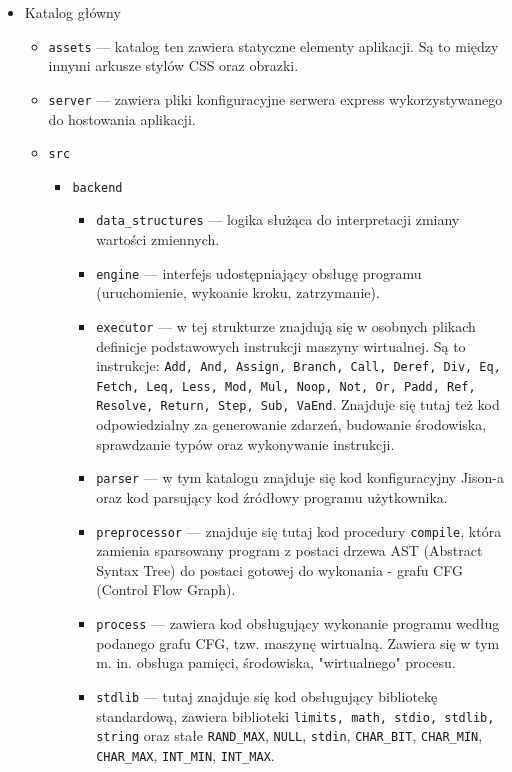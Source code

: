\documentclass[a4paper,twoside,openright,11pt]{report}
\begin{document}
  \begin {itemize}
    \item Katalog główny
    \begin {itemize}
      \item \texttt{assets} --- katalog ten zawiera statyczne elementy aplikacji. Są to między innymi arkusze stylów CSS oraz obrazki.
      \item \texttt{server} --- zawiera pliki konfiguracyjne serwera express wykorzystywanego do hostowania aplikacji.
      \item \texttt{src}
      \begin {itemize}
        \item \texttt{backend}
	\begin {itemize}
	  \item \texttt{data\_structures} --- logika służąca do interpretacji zmiany wartości zmiennych.
	  \item \texttt{engine} --- interfejs udostępniający obsługę programu (uruchomienie, wykoanie kroku, zatrzymanie).
	  \item \texttt{executor} --- w tej strukturze znajdują się w osobnych plikach definicje podstawowych instrukcji maszyny wirtualnej. Są to instrukcje: \texttt{Add, And, Assign, Branch, Call, Deref, Div, Eq, Fetch, Leq, Less, Mod, Mul, Noop, Not, Or, Padd, Ref, Resolve, Return, Step, Sub, VaEnd}. Znajduje się tutaj też kod odpowiedzialny za generowanie zdarzeń, budowanie środowiska, sprawdzanie typów oraz wykonywanie instrukcji.
	  \item \texttt{parser} --- w tym katalogu znajduje się kod konfiguracyjny Jison-a oraz kod parsujący kod źródłowy programu użytkownika.
	  \item \texttt{preprocessor} --- znajduje się tutaj kod procedury \texttt{compile}, która zamienia sparsowany program z postaci drzewa AST (Abstract Syntax Tree) do postaci gotowej do wykonania - grafu CFG (Control Flow Graph).
	  \item \texttt{process} --- zawiera kod obsługujący wykonanie programu według podanego grafu CFG, tzw. maszynę wirtualną. Zawiera się w tym m. in. obsługa pamięci, środowiska, "wirtualnego" procesu.
	  \item \texttt{stdlib} --- tutaj znajduje się kod obsługujący bibliotekę standardową, zawiera biblioteki \texttt{limits, math, stdio, stdlib, string} oraz stałe \texttt{RAND\_MAX}, \texttt{NULL}, \texttt{stdin}, \texttt{CHAR\_BIT}, \texttt{CHAR\_MIN}, \texttt{CHAR\_MAX}, \texttt{INT\_MIN}, \texttt{INT\_MAX}.
	\end {itemize} 

\end{itemize}
\end{itemize}
\end{itemize}
\end{document}
